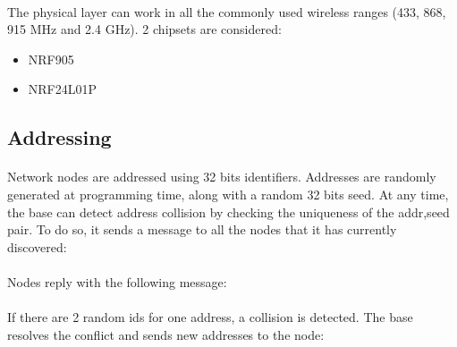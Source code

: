 \documentclass[a4paper, 11pt]{article}
\begin{document}
\paragraph{}
The physical layer can work in all the commonly used wireless ranges (433, 868,
915 MHz and 2.4 GHz). 2 chipsets are considered:
\begin{itemize}
\item NRF905
\item NRF24L01P
\end{itemize}


\subsection{Addressing}
\paragraph{}
Network nodes are addressed using 32 bits identifiers. Addresses are randomly
generated at programming time, along with a random 32 bits seed. At any time,
the base can detect address collision by checking the uniqueness of the
addr,seed pair. To do so, it sends a message to all the nodes that it has
currently discovered:

\paragraph{}
Nodes reply with the following message:

\paragraph{}
If there are 2 random ids for one address, a collision is detected. The base
resolves the conflict and sends new addresses to the node:

\paragraph{}
\end{document}
